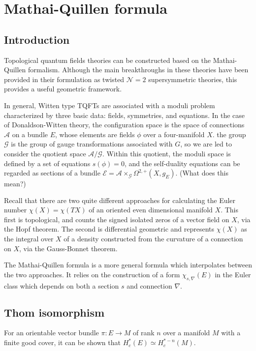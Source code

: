 
\chapter{Mathai-Quillen formula}
\label{chapter3}
\section{Introduction}
Topological quantum fields theories can be constructed based on the
Mathai-Quillen formalism. Although the main breakthroughs in these theories have
been provided in their formulation as twisted $\mathcal{N}=2$ supersymmetric
theories, this provides a useful geometric framework.\cite{TQFTbook}

In general, Witten type TQFTs are associated with a moduli problem characterized
by three basic data: fields, symmetries, and equations.
In the case of Donaldson-Witten theory, the configuration space is the space of
connections $\mathcal{A}$ on a bundle $E$, whose elements are fields 
$\phi$ over a four-manifold  $X$.  the group $\mathcal{G}$ is the group of gauge
transformations associated with $G$, so we are led to consider the quotient
space  $\mathcal{A}/\mathcal{G}$. Within this quotient, the moduli space is
defined by a set of equations $s(\phi)=0$, and the self-duality equations can be
regarded as sections of a bundle
$\mathcal{E}=\mathcal{A}\times_{\mathcal{G}}\Omega^{2,+}(X,g_E)$. (What does
this mean?)
  
Recall that there are two quite different approaches for calculating the Euler number
$\chi(X) = \chi(TX)$ of an oriented even dimensional manifold $X$. 
This first is topological, and counts
the signed isolated zeros of a vector field on $X$, via the Hopf theorem. The
second is differential geometric and represents  $\chi(X)$ as the integral over
$X$ of a density constructed from the curvature of a connection on $X$, via
the Gauss-Bonnet theorem. 

The Mathai-Quillen formula \cite{MQformula} is a more general formula which interpolates between
the two approaches. It relies on the construction of a form $\chi_{s,\nabla}(E)$ in
the Euler class which depends
on both a section  $s$ and connection  $\nabla$.  

\section{Thom isomorphism}
For an orientable vector bundle $\pi:E\to M$ of rank $n$ over a manifold $M$ 
with a finite good cover, it can be shown that  $H_c^*(E)\simeq H_c^{*-n}(M)$.\cite[Prop
6.13]{bott_tu} 

